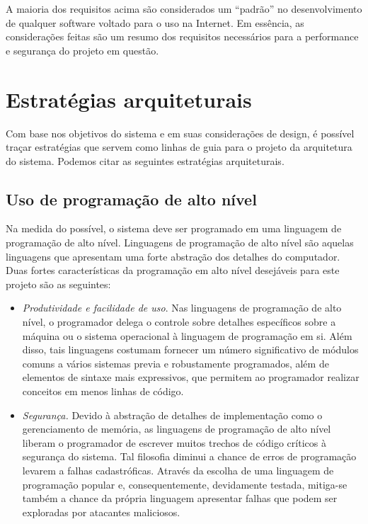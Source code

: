 \documentclass[ruledheader, 12pt]{abnt}
\begin{document}
A maioria dos requisitos acima são considerados um ``padrão'' no desenvolvimento de qualquer software voltado para o uso na Internet. Em essência, as considerações feitas são um resumo dos requisitos necessários para a performance e segurança do projeto em questão.

\section{Estratégias arquiteturais}

Com base nos objetivos do sistema e em suas considerações de design, é possível traçar estratégias que servem como linhas de guia para o projeto da arquitetura do sistema. Podemos citar as seguintes estratégias arquiteturais.

\subsection{Uso de programação de alto nível}

Na medida do possível, o sistema deve ser programado em uma linguagem de programação de alto nível. Linguagens de programação de alto nível são aquelas linguagens que apresentam uma forte abstração dos detalhes do computador. Duas fortes características da programação em alto nível desejáveis para este projeto são as seguintes:
\begin{itemize}
	\item \emph{Produtividade e facilidade de uso}. Nas linguagens de programação de alto nível, o programador delega o controle sobre detalhes específicos sobre a máquina ou o sistema operacional à linguagem de programação em si. Além disso, tais linguagens costumam fornecer um número significativo de módulos comuns a vários sistemas previa e robustamente programados, além de elementos de sintaxe mais expressivos, que permitem ao programador realizar conceitos em menos linhas de código.
	
	\item \emph{Segurança.} Devido à abstração de detalhes de implementação como o gerenciamento de memória, as linguagens de programação de alto nível liberam o programador de escrever muitos trechos de código críticos à segurança do sistema. Tal filosofia diminui a chance de erros de programação levarem a falhas cadastróficas. Através da escolha de uma linguagem de programação popular e, consequentemente, devidamente testada, mitiga-se também a chance da própria linguagem apresentar falhas que podem ser exploradas por atacantes maliciosos.
\end{itemize}
\end{document}
